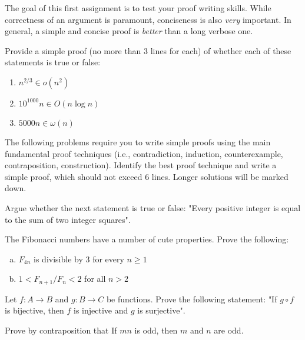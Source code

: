 \documentclass{common/cs157}
\begin{document}
\homeworkhandin %

The goal of this first assignment is to test your proof writing skills. While correctness of an argument is paramount, conciseness is also \emph{very} important. In general, a simple and concise proof is \emph{better} than a long verbose one. 

\begin{problem}{1}
Provide a simple proof (no more than 3 lines for each) of whether each of these statements is true or false:
\begin{enumerate}
    \item $n^{2/3} \in o(n^2)$
    \item $10^{1000}n \in O(n\log n)$
    \item $5000n \in \omega(n)$
\end{enumerate}
\end{problem}

The following problems require you to write simple proofs using the main fundamental proof techniques (i.e., contradiction, induction, counterexample, contraposition, construction). Identify the best proof technique and write a simple proof, which should not exceed 6 lines. Longer solutions will be marked down.

\begin{problem}{2}
Argue whether the next statement is true or false: "Every positive integer is equal to the sum of two integer squares".
\end{problem}

\begin{problem}{3}
The Fibonacci numbers have a number of cute properties. Prove the following:  
\begin{enumerate}[(a)]
\item $F_{4n}$ is divisible by 3 for every $n\geq1$
\item $1 < F_{n+1}/F_{n} < 2$ for all $n > 2$
\end{enumerate}
\end{problem}

\begin{problem}{4}
Let $f : A \longrightarrow B$ and $g : B \longrightarrow C$ be functions. Prove the following statement: "If $g \circ f$ is bijective, then $f$ is injective and $g$ is surjective".
\end{problem}

\begin{problem}{5}
Prove by contraposition that If $mn$ is odd, then $m$ and $n$ are odd.
\end{problem}
\end{document}
